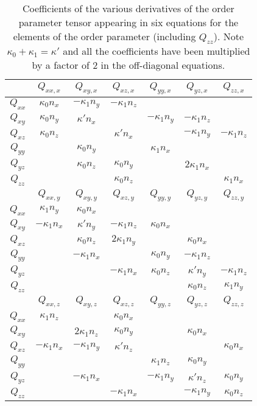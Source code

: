 \begin{table}[t]
\centering
\tabcolsep=4pt
\begin{tabular}{|c|cccccc|}
\hline
&
$Q_{xx,x}$ & $Q_{xy,x}$ & $Q_{xz,x}$ & $Q_{yy,x}$ & $Q_{yz,x}$ & $Q_{zz,x}$\\
\hline
$Q_{xx}$ &
$\kappa_0 n_x$ & $-\kappa_1 n_y$ & $-\kappa_1 n_z$ & & &\\
$Q_{xy}$ &
$\kappa_0 n_y$ & $\kappa' n_x$ & & $-\kappa_1 n_y$  & $-\kappa_1 n_z$ & \\
$Q_{xz}$ &
$\kappa_0 n_z$ & & $\kappa' n_x$ & & $-\kappa_1 n_y$ &$ -\kappa_1 n_z$\\
$Q_{yy}$ &
 & $\kappa_0 n_y$ & & $\kappa_1 n_x$ & &\\
$Q_{yz}$ &
 & $\kappa_0 n_z$ & $\kappa_0 n_y$ & & $2\kappa_1 n_x$ & \\
$Q_{zz}$ &
 & & $\kappa_0 n_z$ & & & $\kappa_1 n_x$\\
\hline
\hline
&
$Q_{xx,y}$ & $Q_{xy,y}$ & $Q_{xz,y}$ & $Q_{yy,y}$ & $Q_{yz,y}$ & $Q_{zz,y}$\\
\hline
$Q_{xx}$ &
$\kappa_1 n_y$ & $\kappa_0 n_x$ & & & &\\
$Q_{xy}$ &
$-\kappa_1 n_x$ & $\kappa' n_y$ & $-\kappa_1 n_z$ & $\kappa_0 n_x$ & &\\
$Q_{xz}$ &
 & $\kappa_0 n_z$ & $2\kappa_1 n_y$ & & $\kappa_0 n_x$ & \\
$Q_{yy}$ &
 & $-\kappa_1 n_x$ & & $\kappa_0 n_y$ & $-\kappa_1 n_z$ & \\
$Q_{yz}$ &
 & & $-\kappa_1 n_x$ & $\kappa_0 n_z$ & $\kappa' n_y$ & $-\kappa_1 n_z$\\
$Q_{zz}$ &
 & & & & $\kappa_0 n_z$ & $\kappa_1 n_y$\\
\hline
\hline
&
$Q_{xx,z}$ & $Q_{xy,z}$ & $Q_{xz,z}$ & $Q_{yy,z}$ & $Q_{yz,z}$ & $Q_{zz,z}$\\
\hline
$Q_{xx}$ &
$\kappa_1 n_z$ & & $\kappa_0 n_x$ & & & \\
$Q_{xy}$ &
 & $2\kappa_1 n_z$ & $\kappa_0 n_y$ & & $\kappa_0 n_x$ & \\
$Q_{xz}$ &
$-\kappa_1 n_x$ & $-\kappa_1 n_y$ & $\kappa' n_z$ & & & $\kappa_0 n_x$  \\
$Q_{yy}$ &
 & & & $\kappa_1 n_z$ & $\kappa_0 n_y$ & \\
$Q_{yz}$ &
 & $-\kappa_1 n_x$ & & $-\kappa_1 n_y$ & $\kappa' n_z$ & $\kappa_0 n_y$ \\
$Q_{zz}$ &
 & & $-\kappa_1 n_x$ & & $-\kappa_1 n_y $ & $\kappa_0 n_z$\\
\hline
\end{tabular}
\caption{Coefficients of the various derivatives of the order parameter
tensor appearing in six equations for the elements of the
order parameter (including $Q_{zz}$).
Note $\kappa_0 + \kappa_1 = \kappa'$ and all the
coefficients have been multiplied by a factor of 2 in the off-diagonal
equations.}
\label{table-lc-bc}
\end{table} 


